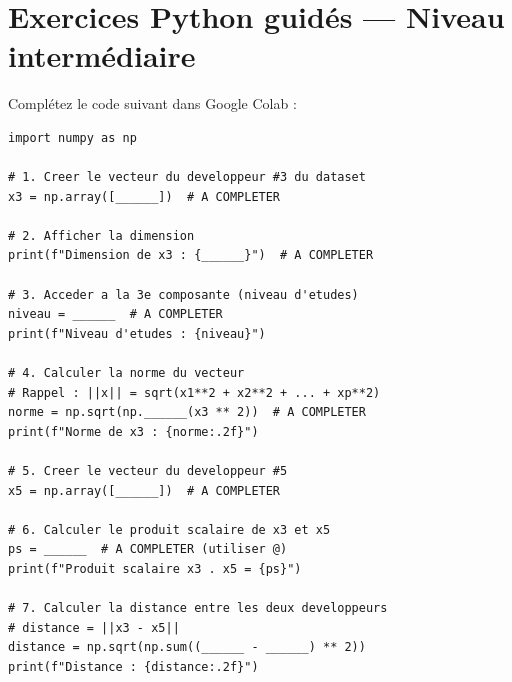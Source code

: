 \section*{Exercices Python guid\'{e}s --- Niveau interm\'{e}diaire}


Compl\'{e}tez le code suivant dans Google Colab :

\begin{pythonbox}
\begin{lstlisting}
import numpy as np

# 1. Creer le vecteur du developpeur #3 du dataset
x3 = np.array([______])  # A COMPLETER

# 2. Afficher la dimension
print(f"Dimension de x3 : {______}")  # A COMPLETER

# 3. Acceder a la 3e composante (niveau d'etudes)
niveau = ______  # A COMPLETER
print(f"Niveau d'etudes : {niveau}")

# 4. Calculer la norme du vecteur
# Rappel : ||x|| = sqrt(x1**2 + x2**2 + ... + xp**2)
norme = np.sqrt(np.______(x3 ** 2))  # A COMPLETER
print(f"Norme de x3 : {norme:.2f}")

# 5. Creer le vecteur du developpeur #5
x5 = np.array([______])  # A COMPLETER

# 6. Calculer le produit scalaire de x3 et x5
ps = ______  # A COMPLETER (utiliser @)
print(f"Produit scalaire x3 . x5 = {ps}")

# 7. Calculer la distance entre les deux developpeurs
# distance = ||x3 - x5||
distance = np.sqrt(np.sum((______ - ______) ** 2))
print(f"Distance : {distance:.2f}")
\end{lstlisting}
\end{pythonbox}


